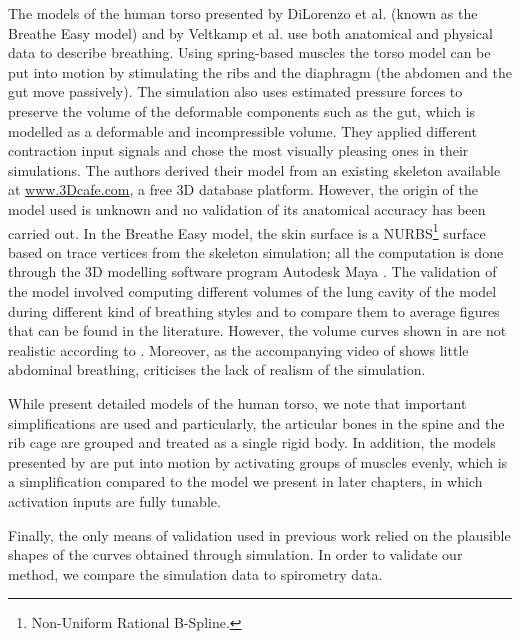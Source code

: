 The models of the human torso presented by DiLorenzo et al. \cite{dilorenzo2008laughing, dilorenzo2009breathing} (known as the Breathe Easy model) and by Veltkamp et al. \cite{veltkamp2009physiological} use both anatomical and physical data to describe breathing. Using spring-based muscles the torso model can be put into motion by stimulating the ribs and the diaphragm (the abdomen and the gut move passively). The simulation also uses estimated pressure forces to preserve the volume of the deformable components such as the gut, which is modelled as a deformable and incompressible volume. They applied different contraction input signals and chose the most visually pleasing ones in their simulations. The authors derived their model from an existing skeleton available at \url{www.3Dcafe.com}, a free 3D database platform. However, the origin of the model used is unknown and no validation of its anatomical accuracy has been carried out.
In the Breathe Easy model, the skin surface is a NURBS\footnote{Non-Uniform Rational B-Spline.} surface based on trace vertices from the skeleton simulation; all the computation is done through the 3D modelling software program Autodesk Maya \cite{maya2010}. The validation of the model involved computing different volumes of the lung cavity of the model during different kind of breathing styles and to compare them to average figures that can be found in the literature. However, the volume curves shown in \cite{dilorenzo2008laughing} are not realistic according to \cite{veltkamp2009physiological}. Moreover, as the accompanying video of \cite{dilorenzo2008laughing} shows little abdominal breathing, \cite{veltkamp2009physiological} criticises the lack of realism of the simulation.

While \cite{nakamura2005somatosensory, zordan2004breathe, dilorenzo2008laughing, veltkamp2009physiological} present detailed models of the human torso, we note that important simplifications are used and particularly, the articular bones in the spine and the rib cage are grouped and treated as a single rigid body. In addition, the models presented by \cite{zordan2004breathe, dilorenzo2008laughing, veltkamp2009physiological} are put into motion by activating groups of muscles evenly, which is a simplification compared to the model we present in later chapters, in which activation inputs are fully tunable.

Finally, the only means of validation used in previous work relied on the plausible shapes of the curves obtained through simulation. In order to validate our method, we compare the simulation data to spirometry data.

